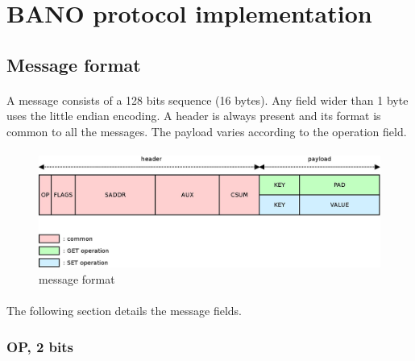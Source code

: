 \documentclass[a4paper, 11pt]{article}
\begin{document}




\section{BANO protocol implementation}

\subsection{Message format}

\paragraph{}
A message consists of a 128 bits sequence (16 bytes). Any field wider than 1
byte uses the little endian encoding. A header is always present and its format
is common to all the messages. The payload varies according to the operation
field.

\paragraph{}
\begin{figure}[!h]
\begin{center}
\includegraphics[scale=0.2]{../dia/implem_format/main.jpeg}
\end{center}
\caption{\tiny{message format}}
\label{implem_format}
\end{figure}


\paragraph{}
The following section details the message fields.

\subsubsection{OP, 2 bits}
\end{document}
